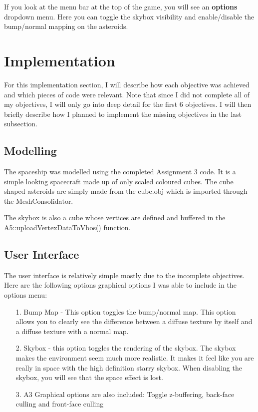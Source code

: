 \documentclass {article}
\begin{document}
If you look at the menu bar at the top of the game, you will see an \textbf{options} dropdown menu. Here you can toggle the skybox visibility and enable/disable the bump/normal mapping on the asteroids.



\newpage
\section{Implementation}
\hspace{0.5cm}For this implementation section, I will describe how each objective was achieved and which pieces of code were relevant. Note that since I did not complete all of my objectives, I will only go into deep detail for the first 6 objectives. I will then briefly describe how I planned to implement the missing objectives in the last subsection.

\subsection{Modelling}

\hspace{0.5cm}The spaceship was modelled using the completed Assignment 3 code. It is a simple looking spacecraft made up of only scaled coloured cubes. The cube shaped asteroids are simply made from the cube.obj which is imported through the MeshConsolidator. 

The skybox is also a cube whose vertices are defined and buffered in the A5::uploadVertexDataToVbos() function.

\subsection{User Interface}
\hspace{0.5cm} The user interface is relatively simple mostly due to the incomplete objectives. Here are the following options graphical options I was able to include in the options menu:
	\begin{itemize}
  	
  		\item[1. ] Bump Map - This option toggles the bump/normal map. This option allows you to clearly see the difference between a diffuse texture by itself and a diffuse texture with a normal map.
  		\item[2. ] Skybox - this option toggles the rendering of the skybox. The skybox makes the environment seem much more realistic. It makes it feel like you are really in space with the high definition starry skybox. When disabling the skybox, you will see that the space effect is lost.
		\item[3. ] A3 Graphical options are also included: Toggle z-buffering, back-face culling and front-face culling 
	\end{itemize}
\end{document}

